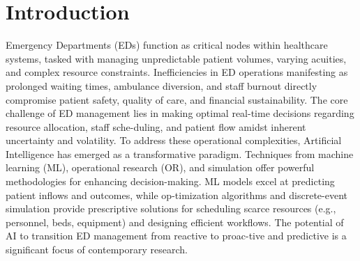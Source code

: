 \documentclass[runningheads]{llncs}
\begin{document}
\section{Introduction}
Emergency Departments (EDs) function as critical nodes within healthcare systems, tasked with managing unpredictable patient volumes, varying acuities, and complex resource constraints. Inefficiencies in ED operations manifesting as prolonged waiting times, ambulance diversion, and staff burnout directly compromise patient safety, quality of care, and financial sustainability. The core challenge of ED management lies in making optimal real-time decisions regarding resource allocation, staff sche-duling, and patient flow amidst inherent uncertainty and volatility.
To address these operational complexities, Artificial Intelligence has emerged as a transformative paradigm. Techniques from machine learning (ML), operational research (OR), and simulation offer powerful methodologies for enhancing decision-making. ML models excel at predicting patient inflows and outcomes, while op-timization algorithms and discrete-event simulation provide prescriptive solutions for scheduling scarce resources (e.g., personnel, beds, equipment) and designing efficient workflows. The potential of AI to transition ED management from reactive to proac-tive and predictive is a significant focus of contemporary research.
\end{document}
